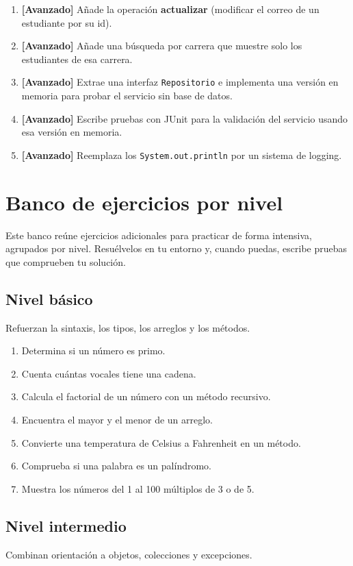\documentclass[11pt]{article}
\begin{document}
\begin{enumerate}[leftmargin=1.7em,itemsep=3pt,topsep=2pt]
\item \textbf{[Avanzado]} Añade la operación \textbf{actualizar} (modificar el correo de un estudiante por su id).
\item \textbf{[Avanzado]} Añade una búsqueda por carrera que muestre solo los estudiantes de esa carrera.
\item \textbf{[Avanzado]} Extrae una interfaz \texttt{Repositorio} e implementa una versión en memoria para probar el servicio sin base de datos.
\item \textbf{[Avanzado]} Escribe pruebas con JUnit para la validación del servicio usando esa versión en memoria.
\item \textbf{[Avanzado]} Reemplaza los \texttt{System.\allowbreak{}out.\allowbreak{}println} por un sistema de logging.
\end{enumerate}
\section{Banco de ejercicios por nivel}
Este banco reúne ejercicios adicionales para practicar de forma intensiva, agrupados por nivel. Resuélvelos en tu entorno y, cuando puedas, escribe pruebas que comprueben tu solución.

\subsection{Nivel básico}
Refuerzan la sintaxis, los tipos, los arreglos y los métodos.

\begin{enumerate}[leftmargin=1.7em,itemsep=3pt,topsep=2pt]
\item Determina si un número es primo.
\item Cuenta cuántas vocales tiene una cadena.
\item Calcula el factorial de un número con un método recursivo.
\item Encuentra el mayor y el menor de un arreglo.
\item Convierte una temperatura de Celsius a Fahrenheit en un método.
\item Comprueba si una palabra es un palíndromo.
\item Muestra los números del 1 al 100 múltiplos de 3 o de 5.
\end{enumerate}
\subsection{Nivel intermedio}
Combinan orientación a objetos, colecciones y excepciones.
\end{document}
